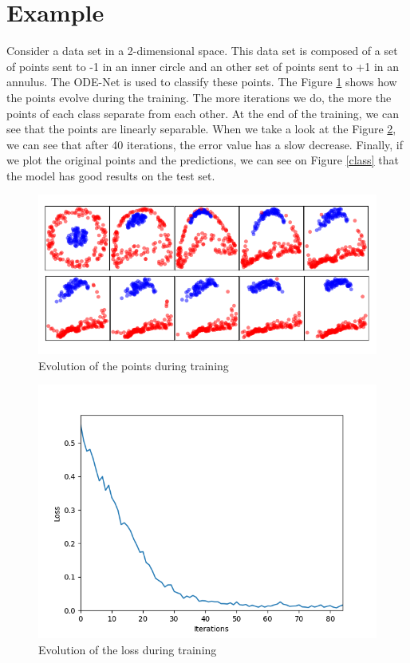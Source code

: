 \documentclass[10pt,a4paper]{article}
\theoremstyle{definition}
\theoremstyle{definition}
\theoremstyle{definition}
\begin{document}
\section{Example}

Consider a data set in a 2-dimensional space. This data set is composed of a set of points sent to -1 in an inner circle and an other set of points sent to +1 in an annulus. The ODE-Net is used to classify these points. The Figure \ref{evol} shows how the points evolve during the training. The more iterations we do, the more the points of each class separate from each other. At the end of the training, we can see that the points are linearly separable. When we take a look at the Figure \ref{loss}, we can see that after 40 iterations, the error value has a slow decrease. Finally, if we plot the original points and the predictions, we can see on Figure \ref{class} that the model has good results on the test set.

\begin{figure}[!h]
\center
\includegraphics[scale=0.6]{evol_spheres.png}
\caption{Evolution of the points during training}
\label{evol}
\end{figure}

\begin{figure}[!h]
\center
\includegraphics[scale=0.65]{loss_spheres.png}
\caption{Evolution of the loss during training}
\label{loss}
\end{figure}
\end{document}
